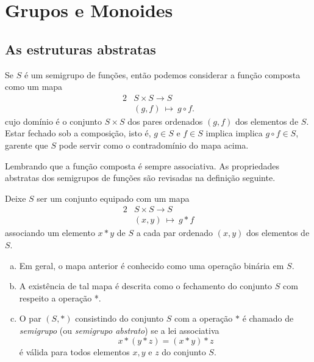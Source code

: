 \section{Grupos e Monoides}
\subsection{As estruturas abstratas}
Se $S$ é um semigrupo de funções, então podemos considerar a função composta como um mapa
\begin{alignat}{2}
  &S \times S \to S \nonumber\\
  &\left(g,f\right)\ \mapsto\ g \circ f.
  \nonumber
\end{alignat}
cujo domínio é o conjunto $S \times S$ dos pares ordenados $(g,f)$ dos elementos de $S$. Estar fechado sob a composição, isto é, $g\in S$ e $f\in S$ implica implica $g\circ f \in S$, garente que $S$ pode servir como o contradomínio do mapa acima.

Lembrando que a função composta é sempre associativa. As propriedades abstratas dos semigrupos de funções são revisadas na definição seguinte.
\begin{definition}[Semigrupos]
  Deixe $S$ ser um conjunto equipado com um mapa
  \begin{alignat}{2}
    &S \times S \to S \nonumber\\
    &\left(x,y\right)\ \mapsto\ g * f
    \nonumber
  \end{alignat}
  associando um elemento $x* y$ de $S$ a cada par ordenado $\left(x,y\right)$ dos elementos de $S$.
  \begin{enumerate}[(a)]
    \item Em geral, o mapa anterior é conhecido como uma operação binária em $S$.
    \item A existência de tal mapa é descrita como o fechamento do conjunto $S$ com respeito a operação *.
    \item O par $\left(S,* \right)$ consistindo do conjunto $S$ com a operação $*$ é chamado de \emph{semigrupo} (ou \emph{semigrupo abstrato}) se a lei associativa $$x * (y * z) = (x * y) * z$$ é válida para todos elementos $x,y$ e $z$ do conjunto $S$.
  \end{enumerate}
\end{definition}

